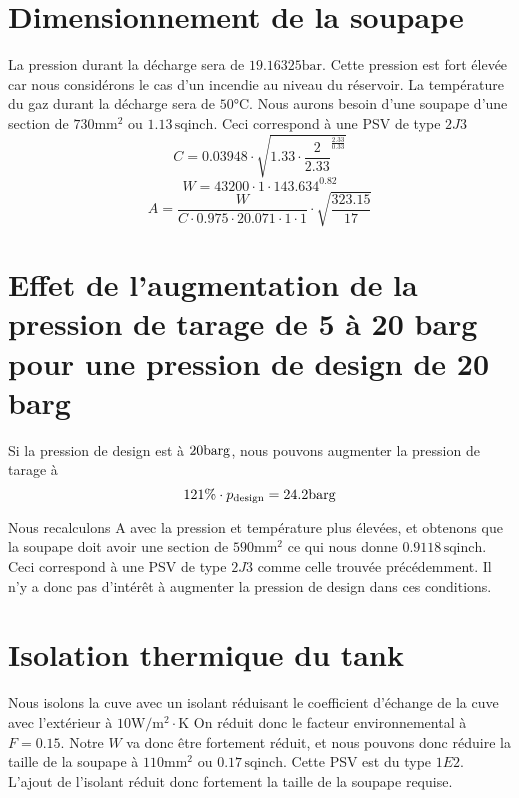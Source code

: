 \section{Dimensionnement de la soupape} 
La pression durant la décharge sera de $19.16325 \si{\bar}$. 
Cette pression est fort élevée car nous considérons le cas d'un incendie au niveau du réservoir. 
La température du gaz durant la décharge sera de $50\si{\celsius}$. 
Nous aurons besoin d'une soupape d'une section de $730\si{\milli\meter\squared}$ 
ou $1.13 \, \text{sqinch}$. Ceci correspond à une PSV de type $2J3$
\[ C = 0.03948 \cdot \sqrt{1.33 \cdot \frac{2}{2.33}^{\frac{2.33}{0.33}}} \]
\[ W = 43200 \cdot 1 \cdot 143.634^{0.82} \]
\[ A = \frac{W}{C \cdot 0.975 \cdot 20.071 \cdot 1 \cdot 1} \cdot \sqrt{\frac{323.15}{17}} \]

\section{Effet de l'augmentation de la pression de tarage de 5 à 20 barg pour une pression de design de 20 barg} 
Si la pression de design est à $20\si{\bar}\text{g}$, nous pouvons augmenter la pression de tarage à \[ 121\% \cdot p_{\text{design}} = 24.2\si{\bar}\text{g} \]

Nous recalculons A avec la pression et température plus élevées,
et obtenons que la soupape doit avoir une section de $590\si{\milli\meter\squared}$
ce qui nous donne $0.9118 \, \text{sqinch}$. Ceci correspond à une PSV de type $2J3$ comme celle trouvée précédemment. Il n'y a donc pas d'intérêt
à augmenter la pression de design dans ces conditions.

\section{Isolation thermique du tank}
Nous isolons la cuve avec un isolant réduisant le coefficient d'échange de la cuve avec l'extérieur à 
$10 \si{\watt}/\si{\meter\squared} \cdot \si{\kelvin}$
On réduit donc le facteur environnemental à $F = 0.15$. 
Notre $W$ va donc être fortement réduit, et nous pouvons donc réduire la taille de la soupape à 
$110\si{\milli\meter\squared}$ ou $0.17 \, \text{sqinch}$. Cette PSV est du type $1E2$. L'ajout de l'isolant réduit donc fortement la taille de
la soupape requise.

